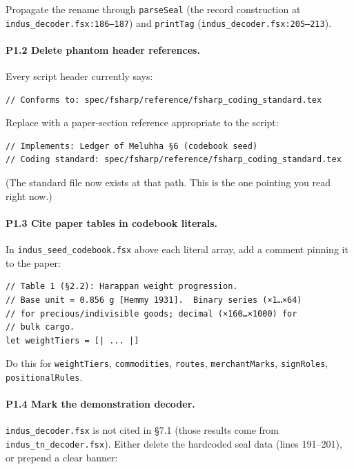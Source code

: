 \documentclass[11pt]{article}
\begin{document}
Propagate the rename through \texttt{parseSeal} (the record
construction at \texttt{indus\_decoder.fsx:186--187}) and
\texttt{printTag} (\texttt{indus\_decoder.fsx:205--213}).

\paragraph{P1.2 Delete phantom header references.}
Every script header currently says:

\begin{Verbatim}[fontsize=\small]
// Conforms to: spec/fsharp/reference/fsharp_coding_standard.tex
\end{Verbatim}

Replace with a paper-section reference appropriate to the script:

\begin{Verbatim}[fontsize=\small]
// Implements: Ledger of Meluhha §6 (codebook seed)
// Coding standard: spec/fsharp/reference/fsharp_coding_standard.tex
\end{Verbatim}

(The standard file now exists at that path.  This is the one
pointing you read right now.)

\paragraph{P1.3 Cite paper tables in codebook literals.}
In \texttt{indus\_seed\_codebook.fsx} above each literal array,
add a comment pinning it to the paper:

\begin{Verbatim}[fontsize=\small]
// Table 1 (§2.2): Harappan weight progression.
// Base unit = 0.856 g [Hemmy 1931].  Binary series (×1…×64)
// for precious/indivisible goods; decimal (×160…×1000) for
// bulk cargo.
let weightTiers = [| ... |]
\end{Verbatim}

Do this for \texttt{weightTiers}, \texttt{commodities},
\texttt{routes}, \texttt{merchantMarks}, \texttt{signRoles},
\texttt{positionalRules}.

\paragraph{P1.4 Mark the demonstration decoder.}
\texttt{indus\_decoder.fsx} is not cited in \S7.1 (those results
come from \texttt{indus\_tn\_decoder.fsx}).  Either delete the
hardcoded seal data (lines 191--201), or prepend a clear banner:
\end{document}
